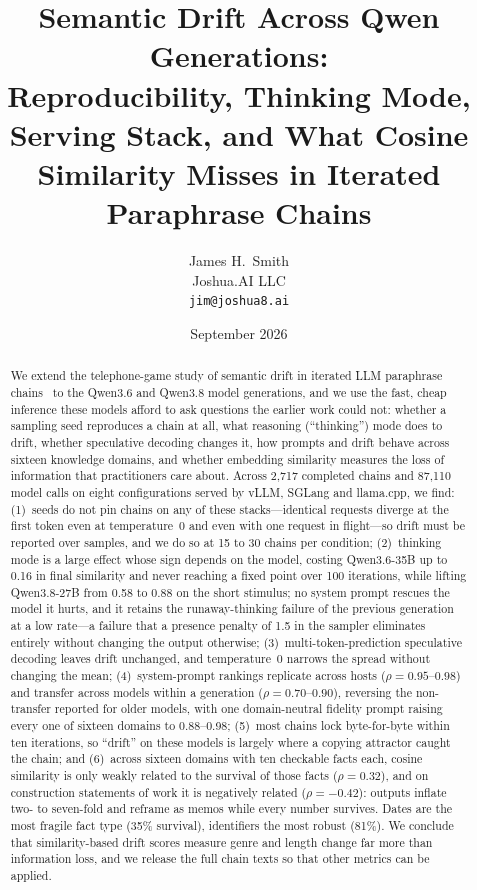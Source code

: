 \documentclass[11pt]{article}
\title{Semantic Drift Across Qwen Generations:\\
Reproducibility, Thinking Mode, Serving Stack, and What Cosine Similarity
Misses in Iterated Paraphrase Chains}
\author{
  James H.\ Smith \\
  Joshua.AI LLC \\
  \texttt{jim@joshua8.ai}
}
\date{September 2026}
\begin{document}
\maketitle

\begin{abstract}
We extend the telephone-game study of semantic drift in iterated LLM
paraphrase chains~\citep{smith2026drift} to the Qwen3.6 and Qwen3.8 model
generations, and we use the fast, cheap inference these models afford to ask
questions the earlier work could not: whether a sampling seed reproduces a
chain at all, what reasoning (``thinking'') mode does to drift, whether
speculative decoding changes it, how prompts and drift behave across sixteen
knowledge domains, and whether embedding similarity measures the loss of
information that practitioners care about. Across 2{,}717 completed chains
and 87{,}110 model calls on eight configurations served by vLLM, SGLang and
llama.cpp, we find:
(1)~seeds do not pin chains on any of these stacks---identical requests
diverge at the first token even at temperature~0 and even with one request in
flight---so drift must be reported over samples, and we do so at 15 to 30
chains per condition;
(2)~thinking mode is a large effect whose sign depends on the model, costing
Qwen3.6-35B up to 0.16 in final similarity and never reaching a fixed point
over 100 iterations, while lifting Qwen3.8-27B from 0.58 to 0.88 on the short
stimulus; no system prompt rescues the model it hurts, and it retains the
runaway-thinking failure of the previous generation at a low rate---a
failure that a presence penalty of 1.5 in the sampler eliminates entirely
without changing the output otherwise;
(3)~multi-token-prediction speculative decoding leaves drift unchanged, and
temperature~0 narrows the spread without changing the mean;
(4)~system-prompt rankings replicate across hosts ($\rho=0.95$--$0.98$) and
transfer across models within a generation ($\rho=0.70$--$0.90$), reversing
the non-transfer reported for older models, with one domain-neutral fidelity
prompt raising every one of sixteen domains to 0.88--0.98;
(5)~most chains lock byte-for-byte within ten iterations, so ``drift'' on
these models is largely where a copying attractor caught the chain; and
(6)~across sixteen domains with ten checkable facts each, cosine similarity
is only weakly related to the survival of those facts ($\rho=0.32$), and on
construction statements of work it is negatively related ($\rho=-0.42$):
outputs inflate two- to seven-fold and reframe as memos while every number
survives. Dates are the most fragile fact type (35\% survival), identifiers
the most robust (81\%). We conclude that similarity-based drift scores
measure genre and length change far more than information loss, and we
release the full chain texts so that other metrics can be applied.
\end{abstract}
\end{document}
